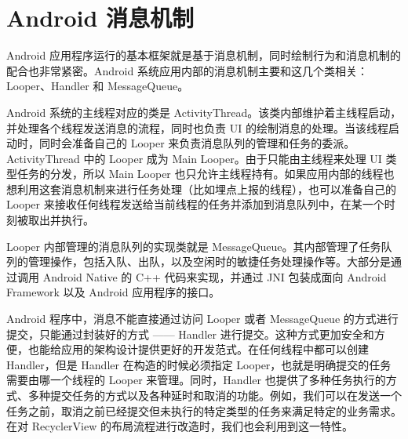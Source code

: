 \chapter{Android 消息机制}

Android 应用程序运行的基本框架就是基于消息机制，同时绘制行为和消息机制的配合也非常紧密。Android 系统应用内部的消息机制主要和这几个类相关：Looper、Handler 和 MessageQueue。

Android 系统的主线程对应的类是 ActivityThread。该类内部维护着主线程启动，并处理各个线程发送消息的流程，同时也负责 UI 的绘制消息的处理。当该线程启动时，同时会准备自己的 Looper 来负责消息队列的管理和任务的委派。ActivityThread 中的 Looper 成为 Main Looper。由于只能由主线程来处理 UI 类型任务的分发，所以 Main Looper 也只允许主线程持有。如果应用内部的线程也想利用这套消息机制来进行任务处理（比如埋点上报的线程），也可以准备自己的 Looper 来接收任何线程发送给当前线程的任务并添加到消息队列中，在某一个时刻被取出并执行。

Looper 内部管理的消息队列的实现类就是 MessageQueue。其内部管理了任务队列的管理操作，包括入队、出队，以及空闲时的敏捷任务处理操作等。大部分是通过调用 Android Native 的 C++ 代码来实现，并通过 JNI 包装成面向 Android Framework 以及 Android 应用程序的接口。

Android 程序中，消息不能直接通过访问 Looper 或者 MessageQueue 的方式进行提交，只能通过封装好的方式 —— Handler 进行提交。这种方式更加安全和方便，也能给应用的架构设计提供更好的开发范式。在任何线程中都可以创建 Handler，但是 Handler 在构造的时候必须指定 Looper，也就是明确提交的任务需要由哪一个线程的 Looper 来管理。同时，Handler 也提供了多种任务执行的方式、多种提交任务的方式以及各种延时和取消的功能。例如，我们可以在发送一个任务之前，取消之前已经提交但未执行的特定类型的任务来满足特定的业务需求。在对 RecyclerView 的布局流程进行改造时，我们也会利用到这一特性。